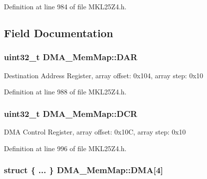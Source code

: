 Definition at line 984 of file M\+K\+L25\+Z4.\+h.



\subsection{Field Documentation}
\subsubsection[{\texorpdfstring{D\+AR}{DAR}}]{\setlength{\rightskip}{0pt plus 5cm}uint32\+\_\+t D\+M\+A\+\_\+\+Mem\+Map\+::\+D\+AR}\hypertarget{struct_d_m_a___mem_map_a22aca0a7ea6ca1da1a58f0fe6f32166f}{}\label{struct_d_m_a___mem_map_a22aca0a7ea6ca1da1a58f0fe6f32166f}
Destination Address Register, array offset\+: 0x104, array step\+: 0x10 

Definition at line 988 of file M\+K\+L25\+Z4.\+h.

\subsubsection[{\texorpdfstring{D\+CR}{DCR}}]{\setlength{\rightskip}{0pt plus 5cm}uint32\+\_\+t D\+M\+A\+\_\+\+Mem\+Map\+::\+D\+CR}\hypertarget{struct_d_m_a___mem_map_a844c0fef8183d262baec56c84a07c070}{}\label{struct_d_m_a___mem_map_a844c0fef8183d262baec56c84a07c070}
D\+MA Control Register, array offset\+: 0x10C, array step\+: 0x10 

Definition at line 996 of file M\+K\+L25\+Z4.\+h.

\subsubsection[{\texorpdfstring{D\+MA}{DMA}}]{\setlength{\rightskip}{0pt plus 5cm}struct \{ ... \}   D\+M\+A\+\_\+\+Mem\+Map\+::\+D\+MA\mbox{[}4\mbox{]}}\hypertarget{struct_d_m_a___mem_map_a03afa3f1b88380a72aee5aa4aec927e9}{}\label{struct_d_m_a___mem_map_a03afa3f1b88380a72aee5aa4aec927e9}

